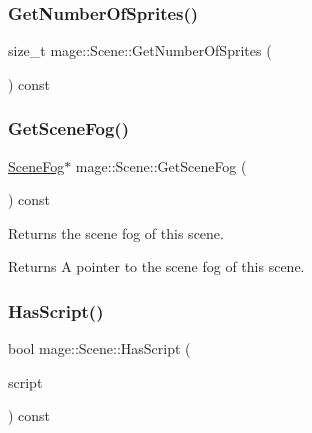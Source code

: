 \hypertarget{classmage_1_1_scene_a124042421abfee563342e50032d4051f}{}\label{classmage_1_1_scene_a124042421abfee563342e50032d4051f} 
\subsubsection{\texorpdfstring{Get\+Number\+Of\+Sprites()}{GetNumberOfSprites()}}
{\footnotesize\ttfamily size\+\_\+t mage\+::\+Scene\+::\+Get\+Number\+Of\+Sprites (\begin{DoxyParamCaption}{ }\end{DoxyParamCaption}) const\hspace{0.3cm}{\ttfamily [noexcept]}}

\hypertarget{classmage_1_1_scene_a1f21d92feb659477ceb4642322fa2f0c}{}\label{classmage_1_1_scene_a1f21d92feb659477ceb4642322fa2f0c} 
\subsubsection{\texorpdfstring{Get\+Scene\+Fog()}{GetSceneFog()}}
{\footnotesize\ttfamily \hyperlink{structmage_1_1_scene_fog}{Scene\+Fog}$\ast$ mage\+::\+Scene\+::\+Get\+Scene\+Fog (\begin{DoxyParamCaption}{ }\end{DoxyParamCaption}) const\hspace{0.3cm}{\ttfamily [noexcept]}}

Returns the scene fog of this scene.

\begin{DoxyReturn}{Returns}
A pointer to the scene fog of this scene. 
\end{DoxyReturn}
\hypertarget{classmage_1_1_scene_a9dd6c49e9db7590de1de4fbd128c78a9}{}\label{classmage_1_1_scene_a9dd6c49e9db7590de1de4fbd128c78a9} 
\subsubsection{\texorpdfstring{Has\+Script()}{HasScript()}}
{\footnotesize\ttfamily bool mage\+::\+Scene\+::\+Has\+Script (\begin{DoxyParamCaption}\item[{\hyperlink{namespacemage_a1e01ae66713838a7a67d30e44c67703e}{Shared\+Ptr}$<$ const \hyperlink{classmage_1_1_behavior_script}{Behavior\+Script} $>$}]{script }\end{DoxyParamCaption}) const}

